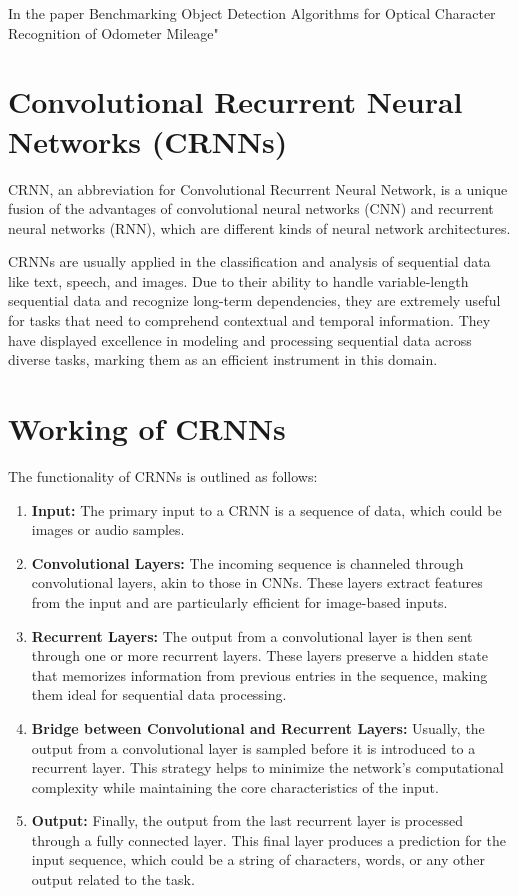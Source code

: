 In the paper Benchmarking Object Detection Algorithms for Optical Character Recognition of Odometer Mileage"
\cite{ahujaDetectingVehicleType}


\newpage
\section{Convolutional Recurrent Neural Networks (CRNNs)}

CRNN, an abbreviation for Convolutional Recurrent Neural Network, is a unique fusion of the advantages of convolutional neural networks (CNN) and recurrent neural networks (RNN), which are different kinds of neural network architectures.

CRNNs are usually applied in the classification and analysis of sequential data like text, speech, and images. Due to their ability to handle variable-length sequential data and recognize long-term dependencies, they are extremely useful for tasks that need to comprehend contextual and temporal information. They have displayed excellence in modeling and processing sequential data across diverse tasks, marking them as an efficient instrument in this domain.

\section{Working of CRNNs}
The functionality of CRNNs is outlined as follows:

\begin{enumerate}
    \item \textbf{Input:} The primary input to a CRNN is a sequence of data, which could be images or audio samples.
    \item \textbf{Convolutional Layers:} The incoming sequence is channeled through convolutional layers, akin to those in CNNs. These layers extract features from the input and are particularly efficient for image-based inputs.
    \item \textbf{Recurrent Layers:} The output from a convolutional layer is then sent through one or more recurrent layers. These layers preserve a hidden state that memorizes information from previous entries in the sequence, making them ideal for sequential data processing.
    \item \textbf{Bridge between Convolutional and Recurrent Layers:} Usually, the output from a convolutional layer is sampled before it is introduced to a recurrent layer. This strategy helps to minimize the network's computational complexity while maintaining the core characteristics of the input.
    \item \textbf{Output:} Finally, the output from the last recurrent layer is processed through a fully connected layer. This final layer produces a prediction for the input sequence, which could be a string of characters, words, or any other output related to the task.
\end{enumerate}

